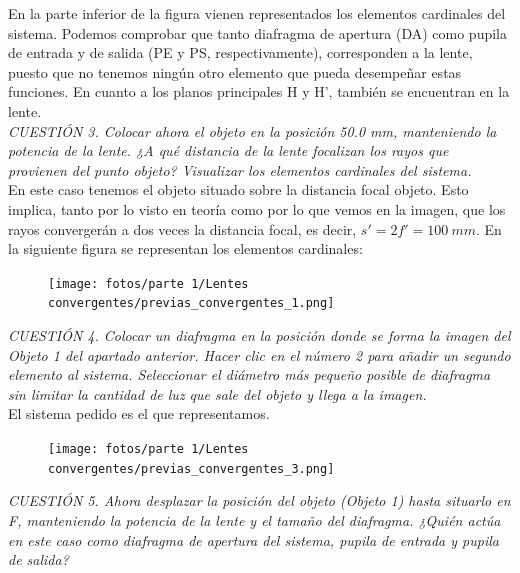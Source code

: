 \documentclass[11pt]{article}
\begin{document}
    \noindent En la parte inferior de la figura vienen representados los elementos cardinales del sistema. Podemos comprobar que tanto diafragma de apertura (DA) como pupila de entrada y de salida (PE y PS, respectivamente), corresponden a la lente, puesto que no tenemos ningún otro elemento que pueda desempeñar estas funciones. En cuanto a los planos principales H y H', también se encuentran en la lente.\\

    \clearpage
    \textit{CUESTIÓN 3.  Colocar ahora el objeto en la posición 50.0 mm, manteniendo la potencia de la lente. ¿A qué distancia de la lente focalizan los rayos que provienen del punto objeto? Visualizar los elementos cardinales del sistema.}\\
    
    \noindent En este caso tenemos el objeto situado sobre la distancia focal objeto. Esto implica, tanto por lo visto en teoría como por lo que vemos en la imagen, que los rayos convergerán a dos veces la distancia focal, es decir, $s' = 2f' = 100\ mm$. En la siguiente figura se representan los elementos cardinales:
    \begin{figure}[ht]
        \centering
        \texttt{[image: fotos/parte 1/Lentes convergentes/previas\_convergentes\_1.png]}
    \end{figure}
    \vspace{10mm}

    \textit{CUESTIÓN 4. Colocar un diafragma en la posición donde se forma la imagen del Objeto 1 del apartado anterior. Hacer clic en el número 2 para añadir un segundo elemento al sistema. Seleccionar el diámetro más pequeño posible de diafragma sin limitar la cantidad de luz que sale del objeto y llega a la imagen.}\\
    
    \noindent El sistema pedido es el que representamos.
    \begin{figure}[ht]
        \centering
        \texttt{[image: fotos/parte 1/Lentes convergentes/previas\_convergentes\_3.png]}
    \end{figure}

    
    \clearpage
    \textit{CUESTIÓN 5. Ahora desplazar la posición del objeto (Objeto 1) hasta situarlo en F, manteniendo la potencia de la lente y el tamaño del diafragma. ¿Quién actúa en este caso como diafragma de apertura del sistema, pupila de entrada y pupila de salida?}
    \vspace{0.3cm}
    
\end{document}
